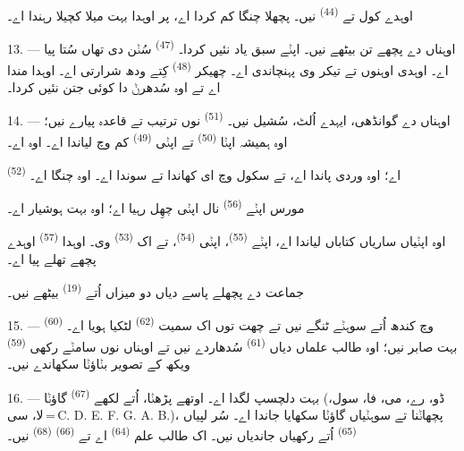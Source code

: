 اوہدے کول  تے  \textsuperscript{(44)} نیں۔ پچھلا چنگا
کم کردا اے، پر اوہدا  بہت میلا کچیلا رہندا اے۔

13. --- اوہناں دے پچھے تن  بیٹھے نیں۔  اپݨے سبق یاد
نئیں کردا۔  \textsuperscript{(47)} سُݨن دی تھاں سُتا پیا اے۔ اوہدی
 اوہنوں  تے  تیکر وی پہنچاندی اے۔ چھیکر
 \textsuperscript{(48)} کِتے ودھ شرارتی اے۔ اوہدا 
مندا اے تے اوہ سُدھرݨ دا کوئی جتن نئیں کردا۔

14. --- اوہناں دے گوانڈھی، ایہدے اُلٹ، سُشیل نیں۔ 
\textsuperscript{(51)} نوں ترتیب تے قاعدہ پیارے نیں؛ اوہ ہمیشہ اپݨا
 \textsuperscript{(50)} تے اپݨی  \textsuperscript{(49)}
کم وچ لیاندا اے۔ اوہ  اے۔

 \textsuperscript{(52)}  اے؛ اوہ وردی پاندا اے،
تے سکول وچ ای کھاندا تے سوندا اے۔ اوہ چنگا  اے۔

مورس اپݨے  \textsuperscript{(56)} نال اپݨی  چھِل رہیا
اے؛ اوہ بہت ہوشیار اے۔

اوہ اپݨیاں ساریاں کتاباں لیاندا اے، اپݨے  \textsuperscript{(55)}،
اپݨی  \textsuperscript{(54)}، تے اک 
\textsuperscript{(53)} وی۔ اوہدا  \textsuperscript{(57)} اوہدے پچھے
تھلے پیا اے۔

جماعت دے پچھلے پاسے دیاں دو میزاں اُتے 
\textsuperscript{(19)} بیٹھے نیں۔

\VUsaut{4.6mm}
\VUsaut{3.4mm}

15. ---  وچ کندھ اُتے سوہݨے  ٹنگے نیں تے
چھت توں اک  سمیت  \textsuperscript{(62)} لٹکیا ہویا اے۔
 \textsuperscript{(60)} بہت صابر نیں؛ اوہ طالب علماں دیاں
 \textsuperscript{(61)} سُدھاردے نیں تے اوہناں نوں سامݨے رکھی
 \textsuperscript{(59)} ویکھ کے تصویر بݨاؤݨا سکھاندے نیں۔

16. ---  بہت دلچسپ لگدا اے۔ اوتھے  پڑھݨا،
 اُتے لکھے  \textsuperscript{(67)} گاؤݨا (ڈو، رے، می،
فا، سول، لا، سی\,=\,C. D. E. F. G. A. B.)،  پچھاݨنا تے سوہݨیاں
 گاؤݨا سکھایا جاندا اے۔ سُر لپیاں  \textsuperscript{(65)}
اُتے رکھیاں جاندیاں نیں۔ اک طالب علم  \textsuperscript{(64)}
اے تے  \textsuperscript{(66)} 
\textsuperscript{(68)} نیں۔

